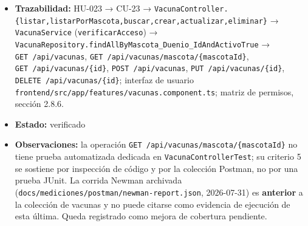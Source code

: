\documentclass[
  spanish,
]{article}
\begin{document}
\begin{itemize}
  \texttt{dueno\allowbreak{}Solo\allowbreak{}Ve\allowbreak{}Vacunas\allowbreak{}De\allowbreak{}Sus\allowbreak{}Propias\allowbreak{}Mascotas} (criterio 3);
  \texttt{dueno\allowbreak{}Consulta\allowbreak{}Vacuna\allowbreak{}De\allowbreak{}Mascota\allowbreak{}Ajena\allowbreak{}Devuelve403},
  \texttt{buscar\allowbreak{}Vacuna\allowbreak{}Inexistente\allowbreak{}Devuelve404} (criterio 4);
  \texttt{admin\allowbreak{}Actualiza\allowbreak{}Vacuna\allowbreak{}Exitosamente},
  \texttt{admin\allowbreak{}Elimina\allowbreak{}Vacuna\allowbreak{}Exitosamente} (criterio 6). Criterio 5:
  inspección de \texttt{Vacuna\allowbreak{}Service.\allowbreak{}listar\allowbreak{}Por\allowbreak{}Mascota}, que invoca
  \texttt{verificar\allowbreak{}Acceso(usuario,\allowbreak{}\ mascota)} antes de consultar el
  repositorio, aplicando la misma regla que los criterios 3 y 4; y
  colección Postman
  \texttt{docs/\allowbreak{}postman/\allowbreak{}BIOPET-\allowbreak{}Vacunas.\allowbreak{}postman\_\allowbreak{}collectio\allowbreak{}n.\allowbreak{}json} (12
  requests, ejecutable con Newman).
\item
  \textbf{Trazabilidad:} HU-023 → CU-23 →
  \texttt{Vacuna\allowbreak{}Controller.\allowbreak{}\{listar,\allowbreak{}listar\allowbreak{}Por\allowbreak{}Mascota,\allowbreak{}buscar,\allowbreak{}crear,\allowbreak{}actualizar,\allowbreak{}eliminar\}}
  → \texttt{Vacuna\allowbreak{}Service} (\texttt{verificar\allowbreak{}Acceso}) →
  \texttt{Vacuna\allowbreak{}Repository.\allowbreak{}find\allowbreak{}All\allowbreak{}By\allowbreak{}Mascota\_\allowbreak{}Duenio\_\allowbreak{}Id\allowbreak{}And\allowbreak{}Activo\allowbreak{}True} →
  \texttt{GET\ /\allowbreak{}api/\allowbreak{}vacunas},
  \texttt{GET\ /\allowbreak{}api/\allowbreak{}vacunas/\allowbreak{}mascota/\allowbreak{}\{mascota\allowbreak{}Id\}},
  \texttt{GET\ /\allowbreak{}api/\allowbreak{}vacunas/\allowbreak{}\{id\}}, \texttt{POST\ /\allowbreak{}api/\allowbreak{}vacunas},
  \texttt{PUT\ /\allowbreak{}api/\allowbreak{}vacunas/\allowbreak{}\{id\}},
  \texttt{DELETE\ /\allowbreak{}api/\allowbreak{}vacunas/\allowbreak{}\{id\}}; interfaz de usuario
  \texttt{frontend/\allowbreak{}src/\allowbreak{}app/\allowbreak{}features/\allowbreak{}vacunas.\allowbreak{}component.\allowbreak{}ts}; matriz de
  permisos, sección 2.8.6.
\item
  \textbf{Estado:} verificado
\item
  \textbf{Observaciones:} la operación
  \texttt{GET\ /\allowbreak{}api/\allowbreak{}vacunas/\allowbreak{}mascota/\allowbreak{}\{mascota\allowbreak{}Id\}} no tiene prueba
  automatizada dedicada en \texttt{Vacuna\allowbreak{}Controller\allowbreak{}Test}; su criterio 5
  se sostiene por inspección de código y por la colección Postman, no
  por una prueba JUnit. La corrida Newman archivada
  (\texttt{docs/\allowbreak{}mediciones/\allowbreak{}postman/\allowbreak{}newman-\allowbreak{}report.\allowbreak{}json}, 2026-07-31) es
  \textbf{anterior} a la colección de vacunas y no puede citarse como
  evidencia de ejecución de esta última. Queda registrado como mejora de
  cobertura pendiente.
\end{itemize}
\end{document}
